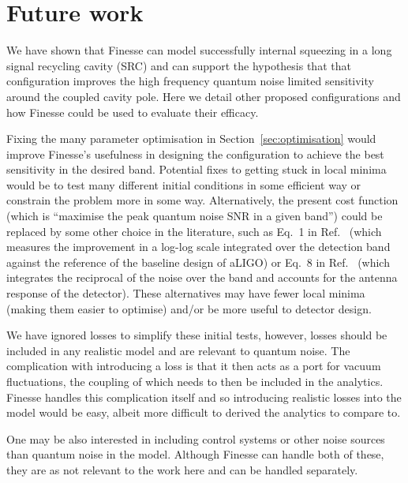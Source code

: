 \documentclass[aps,pra,superscriptaddress,reprint,nofootinbib]{revtex4-1}
\begin{document}
\section{Future work}
\label{sec:future_work}

We have shown that Finesse can model successfully internal squeezing in a long signal recycling cavity (SRC) and can support the hypothesis that that configuration improves the high frequency quantum noise limited sensitivity around the coupled cavity pole. Here we detail other proposed configurations and how Finesse could be used to evaluate their efficacy.


Fixing the many parameter optimisation in Section~\ref{sec:optimisation} would improve Finesse’s usefulness in designing the configuration to achieve the best sensitivity in the desired band. Potential fixes to getting stuck in local minima would be to test many different initial conditions in some efficient way or constrain the problem more in some way. Alternatively, the present cost function (which is “maximise the peak quantum noise SNR in a given band”) could be replaced by some other choice in the literature, such as Eq.~1 in Ref.~\cite{Miao_2014} (which measures the improvement in a log-log scale integrated over the detection band against the reference of the baseline design of aLIGO) or Eq.~8 in Ref.~\cite{Martynov_2019} (which integrates the reciprocal of the noise over the band and accounts for the antenna response of the detector). These alternatives may have fewer local minima (making them easier to optimise) and/or be more useful to detector design.


We have ignored losses to simplify these initial tests, however, losses should be included in any realistic model and are relevant to quantum noise. The complication with introducing a loss is that it then acts as a port for vacuum fluctuations, the coupling of which needs to then be included in the analytics. Finesse handles this complication itself and so introducing realistic losses into the model would be easy, albeit more difficult to derived the analytics to compare to.


One may be also interested in including control systems or other noise sources than quantum noise in the model. Although Finesse can handle both of these, they are as not relevant to the work here and can be handled separately.
\end{document}
